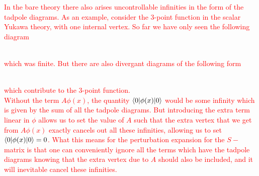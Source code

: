 \documentclass[11pt]{article}
\numberwithin{equation}{section}
\begin{document}
\textcolor{red}{
    In the bare theory there also arises uncontrollable infinities in the form of the tadpole diagrams. As an example, consider the 3-point function in the scalar Yukawa theory, with one internal vertex. So far we have only seen the following diagram 
    \begin{figure}[h]
        \centering
    \end{figure}\\
    which was finite. But there are also divergant diagrams of the following form
    \begin{figure}[h]
    \centering
\end{figure}\\
which contribute to the 3-point function.\\
Without the term \(A\phi(x)\), the quantity \(\braket{0|\phi(x)|0}\) would be some infinity which is given by the sum of all the tadpole diagrams. But introducing the extra term linear in \(\phi\) allows us to set the value of \(A\) such that the extra vertex that we get from \(A\phi(x)\) exactly cancels out all these infinities, allowing us to set \(\braket{0|\phi(x)|0} = 0\). What this means for the perturbation expansion for the \(S-\)matrix is that one can conveniently ignore all the terms which have the tadpole diagrams knowing that the extra vertex due to \(A\) should also be included, and it will inevitable cancel these infinities.\\
}
\end{document}

